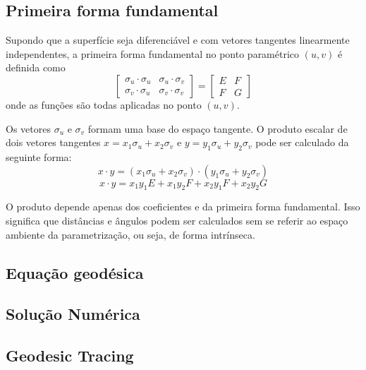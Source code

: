 \subsection{Primeira forma fundamental}
Supondo que a superfície seja diferenciável e com vetores tangentes linearmente independentes,
a primeira forma fundamental no ponto paramétrico $(u,v)$ é definida como
\[
    \left[
        \begin{array}{cc}
            \sigma_u \cdot \sigma_u & \sigma_u \cdot \sigma_v \\
            \sigma_v \cdot \sigma_u & \sigma_v \cdot \sigma_v
        \end{array}
    \right]
    = 
    \left[
        \begin{array}{cc}
            E & F \\
            F & G
        \end{array}
    \right]
\]
onde as funções são todas aplicadas no ponto $(u,v)$.

Os vetores $\sigma_u$ e $\sigma_v$ formam uma base do espaço tangente.
O produto escalar de dois vetores tangentes 
$x = x_1 \sigma_u + x_2 \sigma_v$ e $y = y_1 \sigma_u + y_2 \sigma_v$ pode ser calculado da seguinte forma:
\[x\cdot y = (x_1 \sigma_u + x_2 \sigma_v) \cdot (y_1 \sigma_u + y_2 \sigma_v)\]
\[x\cdot y = x_1 y_1 E + x_1 y_2 F + x_2 y_1 F + x_2 y_2 G\]

O produto depende apenas dos coeficientes e da primeira forma fundamental.
Isso significa que distâncias e ângulos podem ser calculados
sem se referir ao espaço ambiente da parametrização, ou seja, de forma intrínseca.

\subsection{Equação geodésica}

\subsection{Solução Numérica}

\subsection{Geodesic Tracing}
